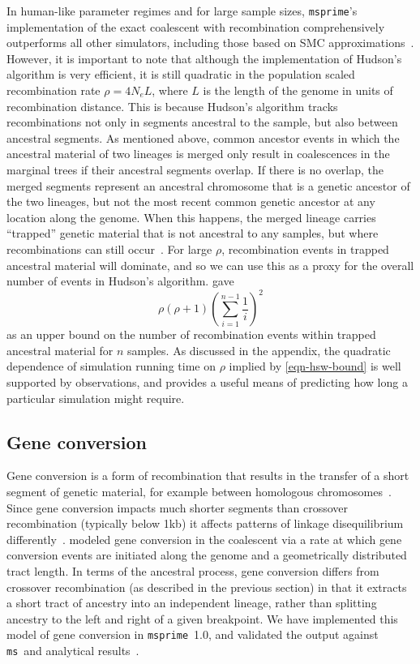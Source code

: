 \documentclass[9pt,twocolumn,twoside,lineno]{gsajnl}
\newcommand{\msprime}[0]{\texttt{msprime}}
\newcommand{\ms}[0]{\texttt{ms}}
\begin{document}
In human-like parameter regimes and for large sample sizes,
\msprime's implementation of the
exact coalescent with recombination comprehensively outperforms
all other simulators, including those based on SMC
approximations~\citep{kelleher2016efficient}. However, it is important
to note that although the implementation of Hudson's algorithm is
very efficient, it is still quadratic in the population scaled recombination rate
$\rho = 4 N_e L$, where $L$ is the length of the genome in units of recombination distance.
This is because Hudson's algorithm tracks recombinations not only
in segments ancestral to the sample, but also between ancestral segments.
As mentioned above, common ancestor events in which the ancestral material
of two lineages is merged only result in coalescences in the marginal trees
if their ancestral segments overlap. If there is no overlap, the merged
segments represent an ancestral chromosome that is a genetic ancestor
of the two lineages, but not the most recent common genetic ancestor
at any location along the genome.
When this happens, the merged lineage carries ``trapped'' genetic material
that is not ancestral to any samples, but where recombinations can still
occur~\citep{wiuf1999recombination}.
For large $\rho$, recombination events in trapped
ancestral material will dominate, and so we can use this as a proxy for the
overall number of events in Hudson's algorithm.
\citet[Eq.~5.10]{hein2004gene} gave
\begin{equation}\label{eqn-hsw-bound}
\rho (\rho + 1) \left( \sum_{i=1}^{n-1} \frac{1}{i} \right)^2
\end{equation}
as an upper bound
on the number of recombination events within trapped ancestral material
for $n$ samples.
As discussed in the  appendix, the quadratic
dependence of simulation running time on $\rho$ implied
by \eqref{eqn-hsw-bound} is well supported
by observations, and provides a useful means of predicting how long
a particular simulation might require.

\subsection*{Gene conversion}
Gene conversion is a form of recombination that results in the transfer
of a short segment of genetic material,
for example between homologous chromosomes~\citep{chen2007gene}.
Since gene conversion impacts much shorter segments than
crossover recombination (typically below 1kb) it
affects patterns of linkage disequilibrium differently~\citep{korunes2017gene}.
\cite{wiuf2000coalescent} modeled gene conversion in the coalescent
via a rate at which gene conversion events are initiated
along the genome and a geometrically distributed tract length.
In terms of the ancestral process, gene conversion differs from
crossover recombination (as described in the previous section)
in that it extracts a short tract of ancestry into
an independent lineage, rather than splitting ancestry
to the left and right of a given breakpoint.
We have implemented this model of gene
conversion in \msprime\ 1.0, and validated the output against
\ms\ and analytical results~\citep{wiuf2000coalescent}.
\end{document}
